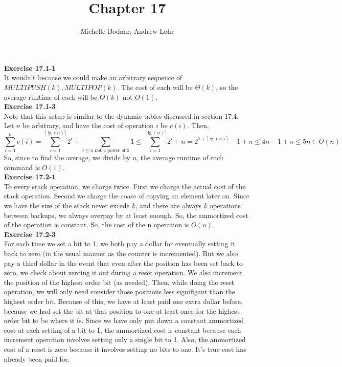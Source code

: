 \documentclass{article}
\title{Chapter 17}
\author{Michelle Bodnar, Andrew Lohr}
\begin{document}
\maketitle


\noindent\textbf{Exercise 17.1-1}\\
It woudn't because we could make an arbitrary sequence of $MULTIPUSH(k), MULTIPOP(k)$. The cost of each will be $\Theta(k)$, so the average runtime of each will be $\Theta(k)$ not $O(1)$.\\

\noindent\textbf{Exercise 17.1-3}\\
Note that this setup is similar to the dynamic tables discussed in section 17.4. Let $n$ be arbitrary, and have the cost of operation $i$ be $c(i)$. Then,
\[
\sum_{i=1}^n c(i) = \sum_{i=1}^{\lceil\lg(n)\rceil} 2^i + \sum_{i\le n \mbox{ not a power of 2}} 1 \le \sum_{i=1}^{\lceil\lg(n)\rceil} 2^i + n = 2^{1 + \lceil\lg(n)\rceil} -1 + n \le 4n -1 +n \le 5n \in O(n)
\]
So, since to find the average, we divide by $n$, the average runtime of each command is $O(1)$.\\

\noindent\textbf{Exercise 17.2-1}\\
To every stack operation, we charge twice. First we charge the actual cost of the stack operation. Second we charge the coase of copying an element later on. Since we have the size of the stack never excede $k$, and there are always $k$ operations between backups, we always overpay by at least enough. So, the ammortized cost of the operation is constant. So, the cost of the n operation is $O(n)$.\\

\noindent\textbf{Exercise 17.2-3}\\
For each time we set a bit to 1, we both pay a dollar for eventually setting it back to zero (in the usual manner as the counter is incremented). But we also pay a third dollar in the event that even after the position has been set back to zero, we check about zeroing it out during a reset operation. We also increment the position of the highest order bit (as needed). Then, while doing the reset operation, we will only need consider those positions less signifigant than the highest order bit. Because of this, we have at least paid one extra dollar before, because we had set the bit at that position to one at least once for the highest order bit to be where it is. Since we have only put down a constant ammortized cost at each setting of a bit to 1, the ammortized cost is constant because each increment operation involves setting only a single bit to 1. Also, the ammortized cost of a reset is zero because it involves setting no bits to one. It's true cost has already been paid for.\\
\end{document}
